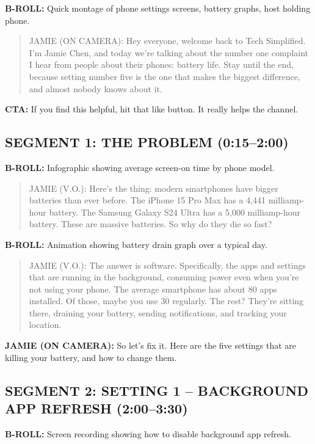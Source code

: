 \documentclass[
    language=english,
    doctype=video-script,
    institution=none,
]{../../omnilatex}
\begin{document}
\textbf{B-ROLL:} Quick montage of phone settings screens, battery graphs, host holding phone.

\begin{quote}
JAMIE (ON CAMERA): Hey everyone, welcome back to Tech Simplified. I'm Jamie Chen, and today we're talking about the number one complaint I hear from people about their phones: battery life. Stay until the end, because setting number five is the one that makes the biggest difference, and almost nobody knows about it.
\end{quote}

\textbf{CTA:} If you find this helpful, hit that like button. It really helps the channel.

\subsection*{SEGMENT 1: THE PROBLEM (0:15--2:00)}

\textbf{B-ROLL:} Infographic showing average screen-on time by phone model.

\begin{quote}
JAMIE (V.O.): Here's the thing: modern smartphones have bigger batteries than ever before. The iPhone 15 Pro Max has a 4,441 milliamp-hour battery. The Samsung Galaxy S24 Ultra has a 5,000 milliamp-hour battery. These are massive batteries. So why do they die so fast?
\end{quote}

\textbf{B-ROLL:} Animation showing battery drain graph over a typical day.

\begin{quote}
JAMIE (V.O.): The answer is software. Specifically, the apps and settings that are running in the background, consuming power even when you're not using your phone. The average smartphone has about 80 apps installed. Of those, maybe you use 30 regularly. The rest? They're sitting there, draining your battery, sending notifications, and tracking your location.
\end{quote}

\textbf{JAMIE (ON CAMERA):} So let's fix it. Here are the five settings that are killing your battery, and how to change them.

\subsection*{SEGMENT 2: SETTING 1 -- BACKGROUND APP REFRESH (2:00--3:30)}

\textbf{B-ROLL:} Screen recording showing how to disable background app refresh.
\end{document}
